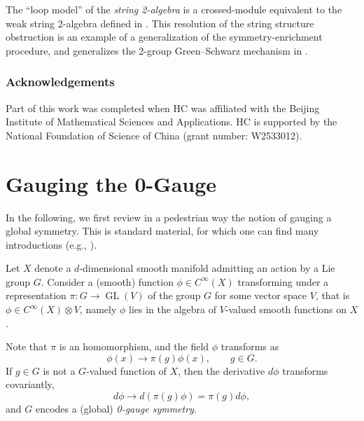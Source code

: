 \documentclass[onecolumn]{article}
\theoremstyle{theorem}
\theoremstyle{remark}
\theoremstyle{example}
\theoremstyle{definition}
\numberwithin{equation}{section}
\begin{document}
{The} ``loop model'' of the \textit{{string 2-algebra}} is a crossed-module equivalent to the weak string 2-algebra defined in \cite{Baez:2005sn}. This resolution of the string structure obstruction is an example of a generalization of the symmetry-enrichment procedure, and generalizes the 2-group Green--Schwarz mechanism in \cite{Benini_2019,Cordova:2018cvg}.

\subsubsection*{Acknowledgements}
Part of this work was completed when HC was affiliated with the Beijing Institute of Mathematical Sciences and Applications. HC is supported by the National Foundation of Science of China (grant number: W2533012).





\section{Gauging the 0-Gauge}\label{sec:gauge0}
In the following, we first review in a pedestrian way the notion of gauging a global symmetry. %
This is standard material, for which one can find many introductions (e.g., \cite{book-baez}). 

Let $X$ denote a $d$-dimensional smooth manifold admitting an action by a Lie group $G$. Consider a (smooth) function $\phi\in C^{\infty}(X)$ transforming under a representation $\pi:G\rightarrow \operatorname{GL}(V)$ of the group $G$ for some vector space $V$, that is  $\phi\in C^{\infty}(X)\otimes V$, namely $\phi$ lies in the algebra of $V$-valued smooth functions on $X$. 

Note that $\pi$ is an homomorphism, and the field $\phi$ transforms as %
\begin{equation}
    \phi(x)\rightarrow \pi (g) \phi(x),\qquad g\in G.\nonumber
\end{equation}
 {If} %
 $g\in G$ is not a $G$-valued function of $X$, then the derivative $d\phi$ transforms covariantly,
 \begin{equation}
     d\phi \rightarrow d(\pi(g)\phi)=\pi(g) d\phi,\nonumber
 \end{equation}
and  $G$ encodes a  (global) \textit{{0-gauge symmetry}}. %
\end{document}
